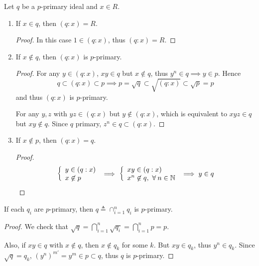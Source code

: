 \begin{prop} \label{prop:primary-divide-by-element}
  Let $q$ be a $p$-primary ideal and $x \in R$.
  \begin{enumerate}
    \item If $x \in q$, then $(q: x) = R$.
      \begin{proof}
        In this case $1 \in (q: x)$, thus $(q: x) = R$.
      \end{proof}
    \item If $x \not\in q$, then $(q: x)$ is $p$-primary.
      \begin{proof}
        For any $y \in (q: x)$, $xy \in q$ but $x \not\in q$, thus $y^n \in q \implies y \in p$.
        Hence
        \[ q \subset (q: x) \subset p \implies p = \sqrt{q} \subset \sqrt{(q: x)} \subset \sqrt{p} = p \]
        and thus $(q: x)$ is $p$-primary.

        For any $y, z$ with $yz \in (q: x)$ but $y \not\in (q: x)$, which is equivalent
        to $xyz \in q$ but $xy \not\in q$. Since $q$ primary, $z^n \in q \subset (q: x)$.
      \end{proof}
    \item If $x \not\in p$, then $(q: x) = q$.
      \begin{proof}
        \[
          \left\{ \begin{array}{l}
            y \in (q: x) \\
            x \not\in p \\
          \end{array} \right. \implies
          \left\{ \begin{array}{l}
            xy \in (q: x) \\
            x^n \not\in q, \ \forall n \in \Nb \\
          \end{array} \right. \implies y \in q
        \]
      \end{proof}
  \end{enumerate}
\end{prop}

\begin{prop}  \label{prop:intersection-of-primary-is-primary}
  If each $q_i$ are $p$-primary, then $q \triangleq \cap_{i = 1}^n q_i$ is $p$-primary.

  \begin{proof}
    We check that $\sqrt{q} = \bigcap_{i = 1}^n \sqrt{q_i} = \bigcap_{i = 1}^n p = p$.

    Also, if $xy \in q$ with $x \not\in q$, then $x \not\in q_k$ for some $k$.
    But $xy \in q_k$, thus $y^n \in q_k$. Since $\sqrt{q} = q_k$, $(y^n)^{m'} = y^m \in p \subset q$,
    thus $q$ is $p$-primary.
  \end{proof}
\end{prop}

